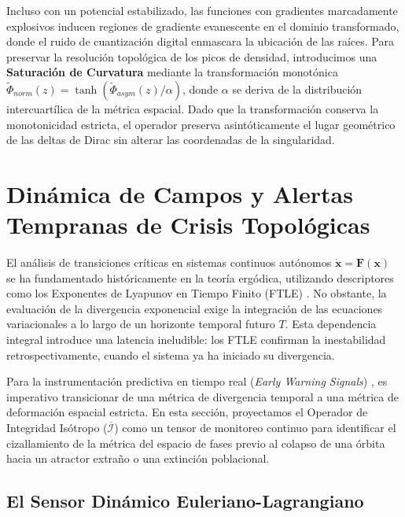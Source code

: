 \documentclass[11pt]{article}
\begin{document}
Incluso con un potencial estabilizado, las funciones con gradientes marcadamente explosivos inducen regiones de gradiente evanescente en el dominio transformado, donde el ruido de cuantización digital enmascara la ubicación de las raíces. Para preservar la resolución topológica de los picos de densidad, introducimos una \textbf{Saturación de Curvatura} mediante la transformación monotónica $\tilde{\Phi}_{norm}(z) = \tanh(\tilde{\Phi}_{asym}(z) / \alpha)$, donde $\alpha$ se deriva de la distribución intercuartílica de la métrica espacial. Dado que la transformación conserva la monotonicidad estricta, el operador preserva asintóticamente el lugar geométrico de las deltas de Dirac sin alterar las coordenadas de la singularidad.


\newpage
\section{Dinámica de Campos y Alertas Tempranas de Crisis Topológicas}
\label{sec:dinamica_campos}

El análisis de transiciones críticas en sistemas continuos autónomos $\dot{\mathbf{x}} = \mathbf{F}(\mathbf{x})$ se ha fundamentado históricamente en la teoría ergódica, utilizando descriptores como los Exponentes de Lyapunov en Tiempo Finito (FTLE) \cite{haller2015lagrangian, guckenheimer2013nonlinear}. No obstante, la evaluación de la divergencia exponencial exige la integración de las ecuaciones variacionales a lo largo de un horizonte temporal futuro $T$. Esta dependencia integral introduce una latencia ineludible: los FTLE confirman la inestabilidad retrospectivamente, cuando el sistema ya ha iniciado su divergencia.

Para la instrumentación predictiva en tiempo real (\textit{Early Warning Signals}) \cite{scheffer2009early}, es imperativo transicionar de una métrica de divergencia temporal a una métrica de deformación espacial estricta. En esta sección, proyectamos el Operador de Integridad Isótropo ($\overline{\mathcal{I}}$) como un tensor de monitoreo continuo para identificar el cizallamiento de la métrica del espacio de fases previo al colapso de una órbita hacia un atractor extraño o una extinción poblacional.

\subsection{El Sensor Dinámico Euleriano-Lagrangiano}
\end{document}
